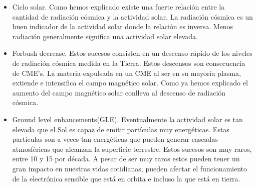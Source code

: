 	\begin{itemize}
		\item	Ciclo solar. Como hemos explicado existe una fuerte relación entre la cantidad de radiación cósmica y la actividad solar. La
			radiación cósmica es un buen indicador de la actividad solar donde la relación es inversa. Menos radiación generalmente
			significa una actividad solar elevada.
		\item	Forbush decrease\cite{Forbush1938}. Estos sucesos consisten en un descenso rápido de los niveles de radiación cósmica medida
			en la Tierra. Estos descensos son consecuencia de CME's. La materia expulsada en un CME al ser en su mayoría plasma, extiende
			e intensifica el campo magnético solar. Como ya hemos explicado el aumento del campo magnético solar conlleva al descenso de
			radiación cósmica.
		\item	Ground level enhancements(GLE). Eventualmente la actividad solar es tan elevada que el Sol es capaz de emitir partículas muy
			energéticas. Estas partículas son a veces tan energéticas que pueden generar cascadas atmosféricas que alcanzan la superficie
			terrestre. Estos sucesos son muy raros, entre 10 y 15 por década. A pesar de ser muy raros estos pueden tener un gran impacto
			en nuestras vidas cotidianas, pueden afectar el funcionamiento de la electrónica sensible que está en orbita e incluso la que
			está en tierra.   
	\end{itemize}

